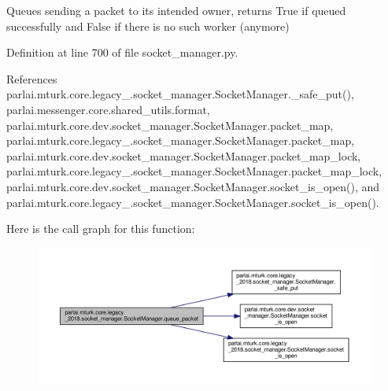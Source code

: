 \begin{DoxyVerb}Queues sending a packet to its intended owner, returns True if
queued successfully and False if there is no such worker (anymore)
\end{DoxyVerb}
 

Definition at line 700 of file socket\+\_\+manager.\+py.



References parlai.\+mturk.\+core.\+legacy\+\_.\+socket\+\_\+manager.\+Socket\+Manager.\+\_\+safe\+\_\+put(), parlai.\+messenger.\+core.\+shared\+\_\+utils.\+format, parlai.\+mturk.\+core.\+dev.\+socket\+\_\+manager.\+Socket\+Manager.\+packet\+\_\+map, parlai.\+mturk.\+core.\+legacy\+\_.\+socket\+\_\+manager.\+Socket\+Manager.\+packet\+\_\+map, parlai.\+mturk.\+core.\+dev.\+socket\+\_\+manager.\+Socket\+Manager.\+packet\+\_\+map\+\_\+lock, parlai.\+mturk.\+core.\+legacy\+\_.\+socket\+\_\+manager.\+Socket\+Manager.\+packet\+\_\+map\+\_\+lock, parlai.\+mturk.\+core.\+dev.\+socket\+\_\+manager.\+Socket\+Manager.\+socket\+\_\+is\+\_\+open(), and parlai.\+mturk.\+core.\+legacy\+\_.\+socket\+\_\+manager.\+Socket\+Manager.\+socket\+\_\+is\+\_\+open().

Here is the call graph for this function\+:
\nopagebreak
\begin{figure}[H]
\begin{center}
\leavevmode
\includegraphics[width=350pt]{classparlai_1_1mturk_1_1core_1_1legacy__2018_1_1socket__manager_1_1SocketManager_a806197fb2a39b170bdc10f93f010318c_cgraph}
\end{center}
\end{figure}
\mbox{\label{classparlai_1_1mturk_1_1core_1_1legacy__2018_1_1socket__manager_1_1SocketManager_a994294d92872fd98ec0fabd9d2a56793}} 
